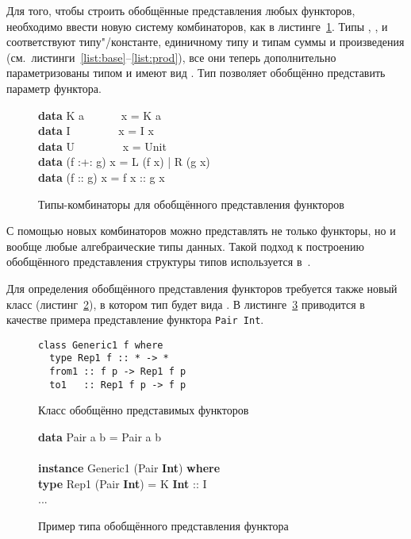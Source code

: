 Для того, чтобы строить обобщённые представления любых
функторов, необходимо ввести новую систему комбинаторов, как в
листинге~\ref{list:combinators}. Типы , ,
 и  соответствуют
типу"/константе, единичному типу и типам суммы и произведения
(см.~листинги~\ref{list:base}--\ref{list:prod}), все они теперь
дополнительно параметризованы типом  и имеют вид
. Тип  позволяет обобщённо представить
параметр функтора.
\begin{figure}[h]
\begin{framed}
\ttfamily\small
\textbf{data} K a~~~~~~ x = K a\\
\textbf{data} I~~~~~~~~ x = I x\\
\textbf{data} U~~~~~~~~ x = Unit\\
\textbf{data} (f :+: g) x = L (f x) | R (g x)\\
\textbf{data} (f :\tms: g) x = f x :\tms: g x
\end{framed}
\caption{Типы-комбинаторы для обобщённого представления функторов}
\label{list:combinators}
\end{figure}

С помощью новых комбинаторов можно представлять не только
функторы, но и вообще любые алгебраические типы данных. Такой
подход к построению обобщённого представления структуры типов
используется в~\cite{MuRec2009}.

Для определения обобщённого представления функторов требуется
также новый класс  (листинг~\ref{list:generic1}), в
котором тип  будет вида . В
листинге~\ref{list:generic-pair} приводится в качестве примера
представление функтора \lstinline{Pair Int}.
\begin{figure}[h]
\begin{framed}
\vspace{-0.25cm}
\begin{lstlisting}
class Generic1 f where
  type Rep1 f :: * -> *
  from1 :: f p -> Rep1 f p
  to1   :: Rep1 f p -> f p
\end{lstlisting}
\vspace{-0.25cm}
\end{framed}
\caption{Класс обобщённо представимых функторов}
\label{list:generic1}
\end{figure}
\begin{figure}[h]
\begin{framed}
\ttfamily\small
\textbf{data} Pair a b = Pair a b\\
\\
\textbf{instance} Generic1 (Pair \textbf{Int}) \textbf{where}\\
\ind\textbf{type} Rep1 (Pair \textbf{Int}) = K \textbf{Int} :\tms: I\\
\ind ...
\end{framed}
\caption{Пример типа обобщённого представления функтора}
\label{list:generic-pair}
\end{figure}

